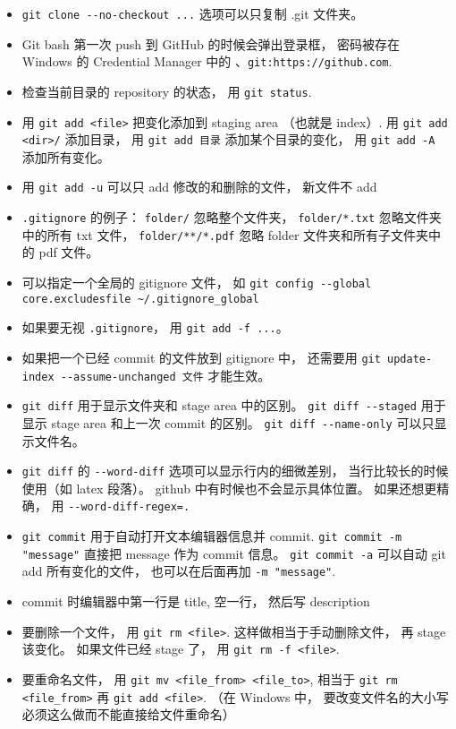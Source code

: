 \begin{itemize}
\item \verb`git clone --no-checkout ...` 选项可以只复制 .git 文件夹。
\item Git bash 第一次 push 到 GitHub 的时候会弹出登录框， 密码被存在 Windows 的 Credential Manager 中的 、\verb`git:https://github.com`.
\item 检查当前目录的 repository 的状态， 用 \verb`git status`. 
\item 用 \verb`git add <file>` 把变化添加到 staging area （也就是 index）. 用 \verb`git add <dir>/` 添加目录， 用 \verb`git add 目录` 添加某个目录的变化， 用 \verb`git add -A` 添加所有变化。
\item 用 \verb`git add -u` 可以只 add 修改的和删除的文件， 新文件不 add
\item \verb`.gitignore` 的例子： \verb`folder/` 忽略整个文件夹， \verb`folder/*.txt` 忽略文件夹中的所有 txt 文件， \verb`folder/**/*.pdf` 忽略 folder 文件夹和所有子文件夹中的 pdf 文件。
\item 可以指定一个全局的 gitignore 文件， 如 \verb`git config --global core.excludesfile ~/.gitignore_global`
\item 如果要无视 \verb`.gitignore`， 用 \verb`git add -f ...`。
\item 如果把一个已经 commit 的文件放到 gitignore 中， 还需要用 \verb`git update-index --assume-unchanged 文件` 才能生效。
\item \verb`git diff` 用于显示文件夹和 stage area 中的区别。 \verb`git diff --staged` 用于显示 stage area 和上一次 commit 的区别。 \verb`git diff --name-only` 可以只显示文件名。
\item \verb`git diff` 的 \verb`--word-diff` 选项可以显示行内的细微差别， 当行比较长的时候使用（如 latex 段落）。 github 中有时候也不会显示具体位置。 如果还想更精确， 用 \verb`--word-diff-regex=.`
\item \verb`git commit` 用于自动打开文本编辑器信息并 commit. \verb`git commit -m "message"` 直接把 message 作为 commit 信息。 \verb`git commit -a` 可以自动 git add 所有变化的文件， 也可以在后面再加 \verb`-m "message"`.
\item commit 时编辑器中第一行是 title, 空一行， 然后写 description
\item 要删除一个文件， 用 \verb`git rm <file>`. 这样做相当于手动删除文件， 再 stage 该变化。 如果文件已经 stage 了， 用 \verb`git rm -f <file>`.
\item 要重命名文件， 用 \verb`git mv <file_from> <file_to>`, 相当于 \verb`git rm <file_from>` 再 \verb`git add <file>`. （在 Windows 中， 要改变文件名的大小写必须这么做而不能直接给文件重命名）

\end{itemize}
